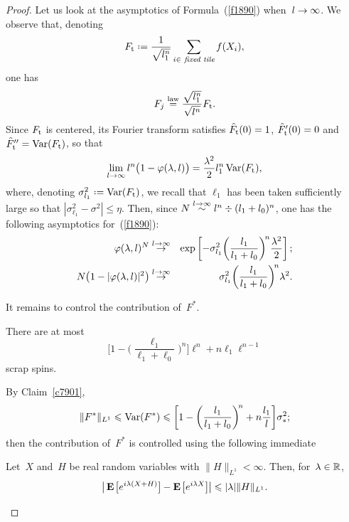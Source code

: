 \begin{proof}
Let us look at the asymptotics of Formula~(\ref{f1890}) when~$\ell \longto \infty$.
We observe that, denoting
\[ F_{\rm t} \coloneqq \frac{1}{\sqrt{\ell_1^n}} \sum_{i\in\text{\it\ fixed tile}} f(X_i) ,\]
one has
\[ F_j \stackrel{\text{law}}{=} \frac{\sqrt{\ell_1^n}}{\sqrt{\ell^n}} F_{\rm t} .\]
%
Since $F_{\rm t}$ is centered, its Fourier transform satisfies $\hat{F}_{\rm t}(0)=1$,
$\hat{F}_{\rm t}'(0)=0$ and $\hat{F}_{\rm t}'' = \Var(F_{\rm t})$, so that
\[ \lim_{\ell\longto\infty} \ell^n \big(1-\phi(\lambda,\ell)\big)
= \frac{\lambda^2}{2} \ell_1^n \Var(F_{\rm t}) ,\]
where, denoting $\sigma^2_{\ell_1} \coloneqq \Var(F_{\rm t})$,
we recall that $\ell_1$ has been taken sufficiently large so that
$|\sigma^2_{\ell_1} - \sigma^2| \leq \eta$.
%
Then, since $N \stackrel{\ell\longto\infty}{\sim} \ell^n \div (\ell_1+\ell_0)^n$,
one has the following asymptotics for~(\ref{f1890}):
\begin{eqnarray}
\phi(\lambda,\ell)^N & \stackrel{\ell\longto\infty}{\longto} &
\exp \left[ -\sigma^2_{\ell_1} \bigg( \frac{\ell_1}{\ell_1+\ell_0} \bigg)^{\!n}
\frac{\lambda^2}{2} \right] ; \\
N \big( 1-|\phi(\lambda,\ell)|^2 \big) & \stackrel{\ell\longto\infty}{\longto} &
\sigma^2_{\ell_1} \bigg( \frac{\ell_1}{\ell_1+\ell_0} \bigg)^{\!n}\lambda^2 .
\end{eqnarray}

It remains to control the contribution of~$F^*$.
%
\begin{Clm}\label{c7901}
There are at most
\[ \bigg[1-\bigg(\frac{\ell_1}{\ell_1+\ell_0}\bigg)^{\!n}\bigg]\ell^n + n\ell_1\ell^{n-1} \]
scrap spins.
\end{Clm}
%
By Claim~\ref{c7901},
\[ \|F^*\|_{L^1} \leq \Var(F^*) \leq
\bigg[1-\bigg(\frac{\ell_1}{\ell_1+\ell_0}\bigg)^{\!n} + n\frac{\ell_1}{\ell} \bigg] \sigma_*^2 ;\]
then the contribution of~$F^*$ is controlled using the following immediate
%
\begin{Lem}
Let~$X$ and~$H$ be real random variables with $\|H\|_{L^1} < \infty$.
Then, for~$\lambda\in\RR$,
\[ \big| \EE\big[e^{i\lambda(X+H)}\big] - \EE\big[e^{i\lambda X}\big] \big| \leq |\lambda| \|H\|_{L^1} .\]
\end{Lem}


\end{proof}
